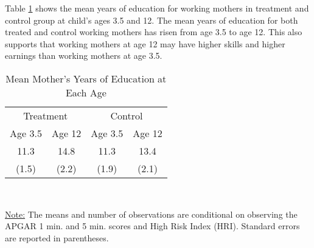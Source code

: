 \documentclass[12pt]{article}
\begin{document}
\noindent Table \ref{tab:education-mean} shows the mean years of education for working mothers in treatment and control group at child's ages 3.5 and 12. The mean years of education for both treated and control working mothers has risen from age 3.5 to age 12. This also supports that working mothers at age 12 may have higher skills and higher earnings than working mothers at age 3.5.


\begin{table}[H] \caption{Mean Mother's Years of Education at Each Age} \label{tab:education-mean}
\centering
	\begin{tabular}{cccc}
	\toprule
	\multicolumn{2}{c}{Treatment} & \multicolumn{2}{c}{Control}  \\\cmidrule(lr){1-2} \cmidrule(lr){3-4} 
 Age 3.5 & Age 12 & Age 3.5 & Age 12 \\
\midrule
11.3 & 14.8 & 11.3 & 13.4 \\ 
(1.5) & (2.2) & (1.9) & (2.1) \\
	\bottomrule
	\end{tabular}
\\ [1ex]
\footnotesize\raggedright\underline{Note:} The means and number of observations are conditional on observing the APGAR 1 min. and 5 min. scores and High Risk Index (HRI). Standard errors are reported in parentheses.
\end{table}
\end{document}
